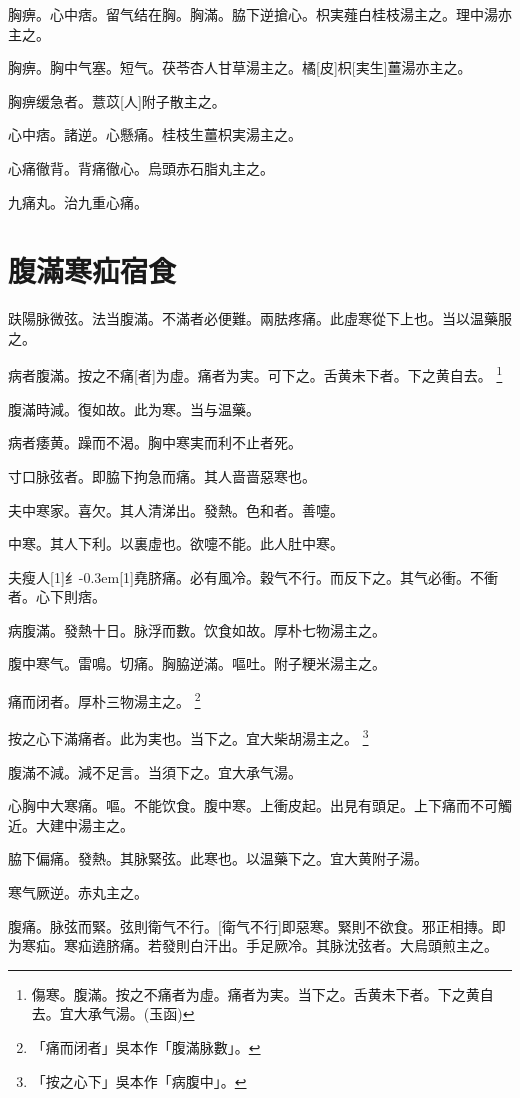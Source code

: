 \documentclass[11pt,oneside,b5paper]{ctexbook}
\begin{document}
\begin{flushleft}
胸痹。心中痞。留气结在胸。胸滿。脇下逆搶心。枳実薤白桂枝湯主之。理中湯亦主之。

胸痹。胸中气塞。短气。茯苓杏人甘草湯主之。橘[皮]枳[実生]薑湯亦主之。

胸痹缓急者。薏苡[人]附子散主之。

心中痞。諸逆。心懸痛。桂枝生薑枳実湯主之。

心痛徹背。背痛徹心。烏頭赤石脂丸主之。

九痛丸。治九重心痛。

\chapter{腹滿寒疝宿食}

趺陽脉微弦。法当腹滿。不滿者必便難。兩胠疼痛。此虛寒從下上也。当以温藥服之。

病者腹滿。按之不痛[者]为虛。痛者为実。可下之。舌黄未下者。下之黄自去。
\footnote{傷寒。腹滿。按之不痛者为虛。痛者为実。当下之。舌黄未下者。下之黄自去。宜大承气湯。(玉函)}

腹滿時減。復如故。此为寒。当与温藥。

病者痿黄。躁而不渴。胸中寒実而利不止者死。

寸口脉弦者。即脇下拘急而痛。其人啬啬惡寒也。

夫中寒家。喜欠。其人清涕出。發熱。色和者。善嚏。

中寒。其人下利。以裏虛也。欲嚏不能。此人肚中寒。

夫瘦人{\hbox{\scalebox{0.6}[1]{纟}\kern-0.3em\scalebox{0.63}[1]{堯}}}脐痛。必有風冷。穀气不行。而反下之。其气必衝。不衝者。心下則痞。

病腹滿。發熱十日。脉浮而數。饮食如故。厚朴七物湯主之。

腹中寒气。雷鳴。切痛。胸脇逆滿。嘔吐。附子粳米湯主之。

痛而闭者。厚朴三物湯主之。
\footnote{「痛而闭者」吳本作「腹滿脉數」。}

按之心下滿痛者。此为実也。当下之。宜大柴胡湯主之。
\footnote{「按之心下」吳本作「病腹中」。}

腹滿不減。減不足言。当須下之。宜大承气湯。

心胸中大寒痛。嘔。不能饮食。腹中寒。上衝皮起。出見有頭足。上下痛而不可觸近。大建中湯主之。

脇下偏痛。發熱。其脉緊弦。此寒也。以温藥下之。宜大黄附子湯。

寒气厥逆。赤丸主之。

腹痛。脉弦而緊。弦則衛气不行。[衛气不行]即惡寒。緊則不欲食。邪正相摶。即为寒疝。寒疝遶脐痛。若發則白汗出。手足厥冷。其脉沈弦者。大烏頭煎主之。


\end{flushleft}
\end{document}
